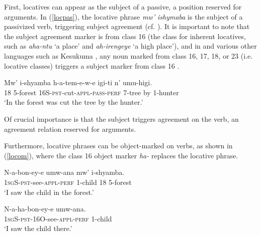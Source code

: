 \documentclass[output=paper]{langsci/langscibook}
\begin{document}
 
First, locatives can appear as the subject of a passive, a position reserved for arguments. In (\ref{locpas}), the locative phrase \emph{mw' ishymaba} is the subject of a passivized verb, triggering subject agreement (cf. \citealt{BresnanKanerva1989,bresnan:1994}). It is important to note that the subject agreement marker is from class 16 (the class for inherent locatives, such as \emph{aha-ntu} `a place' and \emph{ah-irengeye} `a high place'), and in  and various other languages such as Kesukuma {\citealt[245]{batibo:1985}}, any noun marked from class 16, 17, 18, or 23 (i.e. locative classes) triggers a subject marker from class 16  \citep{maho:1999}.


\begin{exe}

	\ex\label{locpas}\gll Mw' i-shyamba h-a-tem-e-w-e igi-ti n' umu-higi.\\
			{\scshape 18} 5-forest 16S-{\scshape pst}-cut-{\scshape appl-pass-perf} 7-tree by 1-hunter\\
			\glt `In the forest was cut the tree by the hunter.'

\end{exe}
%
 Of crucial importance is that the subject triggers agreement on the verb, an agreement relation reserved for arguments.  



Furthermore, locative phrases can be object-marked on verbs, as shown in (\ref{locom}), where the class 16 object marker \emph{ha-} replaces the locative phrase. 

\begin{exe}
	\ex\begin{xlist}
	\ex\label{loco}\gll N-a-bon-ey-e umw-ana mw' i-shyamba.\\
					1{\scshape sg}S-{\scshape pst}-see-{\scshape appl-perf} 1-child 18 5-forest\\
					\glt `I saw the child in the forest.'
					
	\ex\label{locom}\gll N-a-ha-bon-ey-e umw-ana.\\
			1{\scshape sg}S-{\scshape pst-16O}-see-{\scshape appl-perf} 1-child\\
			\glt `I saw the child there.'
	\end{xlist}
\end{exe}

 
 
\end{document}
